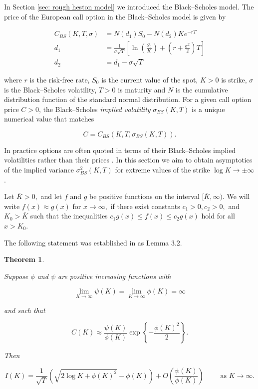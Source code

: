 \documentclass[12pt,twoside]{article}
\theoremstyle{plain}
\theoremstyle{plain}
\newtheorem{theorem}[proposition]{Theorem}
\theoremstyle{definition}
\theoremstyle{remark}
\numberwithin{equation}{section}
\begin{document}
In Section \ref{sec: rough heston model} we introduced the Black–Scholes model. The price of the European call option in the Black–Scholes model is given by

$$
\begin{aligned}
C_{BS}\left(K, T, \sigma \right) &=N\left(d_{1}\right) S_{0}-N\left(d_{2}\right) K e^{-rT} \\[20pt]
d_{1} &=\frac{1}{\sigma \sqrt{T}}\left[\ln \left(\frac{S_{0}}{K}\right)+\left(r+\frac{\sigma^{2}}{2}\right)T\right] \\[5pt]
d_{2} &=d_{1}-\sigma \sqrt{T} \end{aligned}
$$

\vspace{5pt}

where $r$ is the risk-free rate, $S_0$ is the current value of the spot, $K > 0$ is strike, $\sigma$ is the Black–Scholes volatility, $T > 0$ is maturity and $N$ is the cumulative distribution function of the standard normal distribution. For a given call option price $C>0$, the Black–Scholes \emph{implied volatility} $\sigma_{BS}(K, T)$ is a unique numerical value that matches

\begin{equation}
\label{eq: black scholes iv}
C=C_{BS}(K, T, \sigma_{BS}(K, T)).
\end{equation}

In practice options are often quoted in terms of their Black–Scholes implied volatilities rather than their prices \cite{HKLW02}. In this section we aim to obtain asymptotics of the implied variance $\sigma^2_{BS}(K, T)$ for extreme values of the strike $\log K \rightarrow \pm \infty$.

Let $\bar{K}>0,$ and let $f$ and $g$ be positive functions on the interval $[\bar{K}, \infty) .$ We will write $f(x) \approx g(x)$ for $x \rightarrow \infty,$
if there exist constants $c_{1}>0, c_{2}>0,$ and $K_{0}>\bar{K}$ such that the inequalities $c_{1} g(x) \leq f(x) \leq c_{2} g(x)$ hold for all $x>K_0$.

The following statement was established in \cite{GS09b} as Lemma 3.2.

\begin{theorem}
\label{eq: gulisashvili asymptotics of implied variance}

Suppose $\phi$ and $\psi$ are positive increasing functions with

$$
\lim _{K \rightarrow \infty} \psi(K)=\lim _{K \rightarrow \infty} \phi(K)=\infty
$$

and such that

\begin{equation}
\label{eq: asymptotic representation of call}
C(K)\approx \frac{\psi(K)}{\phi(K)} \exp \left\{-\frac{\phi(K)^{2}}{2}\right\}.
\end{equation}

Then

$$
I(K)=\frac{1}{\sqrt{T}}(\sqrt{2 \log K +\phi(K)^{2}}-\phi(K))+O\left(\frac{\psi(K)}{\phi(K)}\right) \qquad  \text{ as } K\rightarrow \infty.
$$

\end{theorem}
\end{document}
